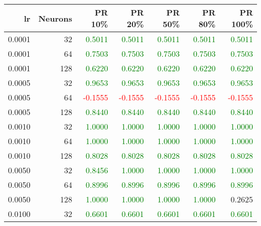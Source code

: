 \begin{tabular}{rrrrrrr}
\toprule
lr & Neurons & PR 10\% & PR 20\% & PR 50\% & PR 80\% & PR 100\% \\
\midrule
0.0001 & 32 & \textcolor{green} {0.5011} & \textcolor{green} {0.5011} & \textcolor{green} {0.5011} & \textcolor{green} {0.5011} & \textcolor{green} {0.5011} \\
0.0001 & 64 & \textcolor{green} {0.7503} & \textcolor{green} {0.7503} & \textcolor{green} {0.7503} & \textcolor{green} {0.7503} & \textcolor{green} {0.7503} \\
0.0001 & 128 & \textcolor{green} {0.6220} & \textcolor{green} {0.6220} & \textcolor{green} {0.6220} & \textcolor{green} {0.6220} & \textcolor{green} {0.6220} \\
0.0005 & 32 & \textcolor{green} {0.9653} & \textcolor{green} {0.9653} & \textcolor{green} {0.9653} & \textcolor{green} {0.9653} & \textcolor{green} {0.9653} \\
0.0005 & 64 & \textcolor{red} {-0.1555} & \textcolor{red} {-0.1555} & \textcolor{red} {-0.1555} & \textcolor{red} {-0.1555} & \textcolor{red} {-0.1555} \\
0.0005 & 128 & \textcolor{green} {0.8440} & \textcolor{green} {0.8440} & \textcolor{green} {0.8440} & \textcolor{green} {0.8440} & \textcolor{green} {0.8440} \\
0.0010 & 32 & \textcolor{green} {1.0000} & \textcolor{green} {1.0000} & \textcolor{green} {1.0000} & \textcolor{green} {1.0000} & \textcolor{green} {1.0000} \\
0.0010 & 64 & \textcolor{green} {1.0000} & \textcolor{green} {1.0000} & \textcolor{green} {1.0000} & \textcolor{green} {1.0000} & \textcolor{green} {1.0000} \\
0.0010 & 128 & \textcolor{green} {0.8028} & \textcolor{green} {0.8028} & \textcolor{green} {0.8028} & \textcolor{green} {0.8028} & \textcolor{green} {0.8028} \\
0.0050 & 32 & \textcolor{green} {0.8456} & \textcolor{green} {1.0000} & \textcolor{green} {1.0000} & \textcolor{green} {1.0000} & \textcolor{green} {1.0000} \\
0.0050 & 64 & \textcolor{green} {0.8996} & \textcolor{green} {0.8996} & \textcolor{green} {0.8996} & \textcolor{green} {0.8996} & \textcolor{green} {0.8996} \\
0.0050 & 128 & \textcolor{green} {1.0000} & \textcolor{green} {1.0000} & \textcolor{green} {1.0000} & \textcolor{green} {1.0000} & \textcolor{blu} {0.2625} \\
0.0100 & 32 & \textcolor{green} {0.6601} & \textcolor{green} {0.6601} & \textcolor{green} {0.6601} & \textcolor{green} {0.6601} & \textcolor{green} {0.6601} \\

\end{tabular}
